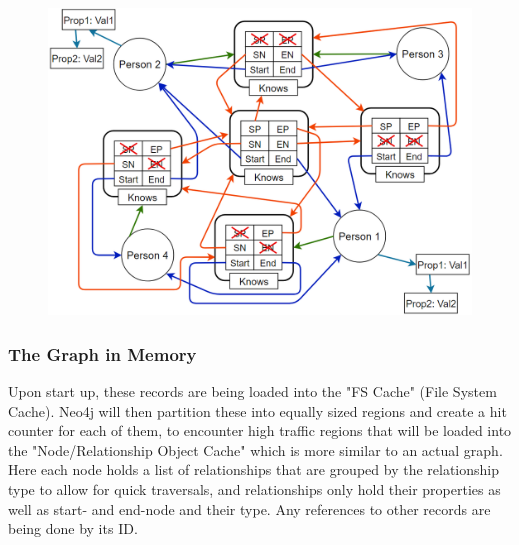 \begin{figure}[h]
\centering
\includegraphics[scale=.5]{Bilder/NeoPointerExpExt.png}
\label{ex:NeoPointerExpExt}
\end{figure}


\subsubsection{The Graph in Memory}
Upon start up, these records are being loaded into the "FS Cache" (File System Cache). Neo4j will then partition these into equally sized regions and create a hit counter for each of them, to encounter high traffic regions that will be loaded into the "Node/Relationship Object Cache" which is more similar to an actual graph. \cite{NeoInternals}\\
Here each node holds a list of relationships that are grouped by the relationship type to allow for quick traversals, and relationships only hold their properties as well as start- and end-node and their type. Any references to other records are being done by its ID. \cite{NeoInternals}

